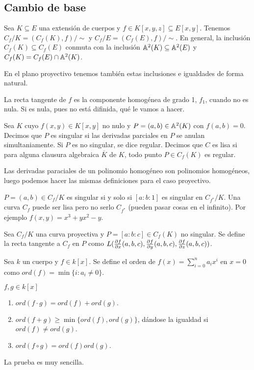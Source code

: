 \documentclass[CR.tex]{subfiles}
\begin{document}
\subsection{Cambio de base}
Sea $K\subseteq E$ una extensión de cuerpos y $f\in K[x,y,z]\subseteq E[x,y]$. Tenemos $C_f/K=(C_f(K),f)/\sim$ y $C_f/E=(C_f(E),f)/\sim$. En general, la inclusión $C_f(K)\subseteq C_f(E)$ conmuta con la inclusión $\mathbb{A}^2(K)\subseteq \mathbb{A}^2(E)$ y $C_f(K)=C_f(E)\cap \mathbb{A}^2(K)$. 

En el plano proyectivo tenemos también estas inclusiones e igualdades de forma natural. 

\begin{defi}
La recta tangente de $f$ es la componente homogénea de grado 1, $f_1$, cuando no es nula. Si es nula, pues no está difinida, qué le vamos a hacer.
\end{defi}


\begin{defi}[2.2.7]
Sea $K$ cuyo $f(x,y)\in K[x,y]$ no nulo y $P=(a,b)\in \mathbb{A}^2(K)$ con $f(a,b)=0$. Decimos que $P$ es singular si las derivadas parciales en $P$ se anulan simultaniamente. Si $P$ es no singular, se dice regular. Decimos que $C$ es lisa si para alguna clausura algebraica $\overline{K}$ de $K$, todo punto $P\in C_f(K)$ es regular. 
\end{defi}

Las derivadas paraciales de un polinomio homogéneo son polinomios homogéneos, luego podemos hacer las mismas definiciones para el caso proyectivo.

\begin{nota}
$P=(a,b)\in C_f/K$ es singular si y solo si $[a:b:1]$ es singular en $C_{f^*}/K$. Una curva $C_f$ puede ser lisa pero no serlo $C_{f^*}$ (pueden pasar cosas en el infinito). Por ejemplo $f(x,y)=x^3+yx^2-y$.
\end{nota}
\begin{defi}
Sea $C_f/K$ una curva proyectiva y $P=[a:b:c]\in C_f(K)$ no singular. Se define la recta tangente a $C_f$ en $P$ como $L(\frac{\partial f}{\partial x}(a,b,c),\frac{\partial f}{\partial y}(a,b,c),\frac{\partial f}{\partial z}(a,b,c))$. 
\end{defi}
\begin{defi}
Sea $k$ un cuerpo y $f\in k[x]$. Se define el orden de $f(x)=\sum_{i=0}^na_ix^i$ en $x=0$ como $ord(f)=\min\{i:a_i\neq 0\}$. 
\end{defi}

\begin{lemma}
$f,g\in k[x]$
\begin{enumerate}
\item $ord(f\cdot g)=ord(f)+ord(g)$.
\item $ord(f+g)\geq\min\{ord(f),ord(g)\}$, dándose la igualdad si $ord(f)\neq ord(g)$.
\item $ord(f\circ g)=ord(f)ord(g)$. 
\end{enumerate}
\end{lemma}
La prueba es muy sencilla.
\end{document}

